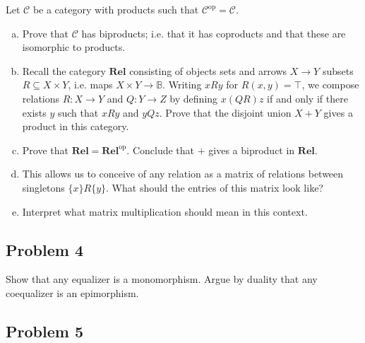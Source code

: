 \documentclass{amsart}
\theoremstyle{remark}
\theoremstyle{definition}
\theoremstyle{definition}
\def\op{^{\text{op}}}
\def\Rel{\mathbf{Rel}}
\def\mcC{\mathcal{C}}
\def\BB{\mathbb B}
\begin{document}
Let $\mcC$ be a category with products such that $\mcC\op = \mcC$. 
\begin{enumerate}[(a)]
    \item Prove that $\mcC$ has biproducts; i.e. that it has coproducts and that these are isomorphic to products.
    
    \item Recall the category $\Rel$ consisting of objects sets and arrows $X\to Y$ subsets $R\subseteq X\times Y$, i.e. maps $X\times Y\to\BB$. Writing $xRy$ for $R(x,y)=\top$, we compose relations $R:X\to Y$ and $Q:Y\to Z$ by defining $x(QR)z$ if and only if there exists $y$ such that $xRy$ and $yQz$. Prove that the disjoint union $X+Y$ gives a product in this category.
    
    \item Prove that $\Rel = \Rel\op$. Conclude that $+$ gives a biproduct in $\Rel$. 
    
    \item This allows us to conceive of any relation as a matrix of relations between singletons $\{x\}R\{y\}$. What should the entries of this matrix look like?
    
    \item Interpret what matrix multiplication should mean in this context.
\end{enumerate}

\subsection{Problem 4}

Show that any equalizer is a monomorphism. Argue by duality that any coequalizer is an epimorphism.

\subsection{Problem 5}
\end{document}
